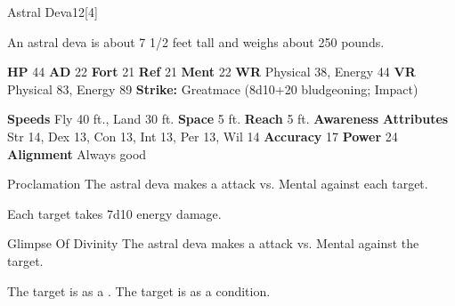       
  \begin{monsubsection}{Astral Deva}{12}[4]
    \vspace{-1em}\vspace{-1em}
    \vspace{0em}

    
          An astral deva is about 7 1/2 feet tall and weighs about 250 pounds.
        

    \begin{spellcontent}
      \begin{spelltargetinginfo}
        \pari \textbf{HP} 44 \monsep
          \textbf{AD} 22 \monsep
          \textbf{Fort} 21 \monsep
          \textbf{Ref} 21 \monsep
          \textbf{Ment} 22
        \pari \textbf{WR} Physical 38, Energy 44 \monsep
        \textbf{VR} Physical 83, Energy 89
        \pari \textbf{Strike:}
            Greatmace  (8d10+20 bludgeoning; Impact)
      \end{spelltargetinginfo}
    \end{spellcontent}
    \begin{monsterfooter}
      \pari \textbf{Speeds} Fly 40 ft., Land 30 ft. \monsep
        \textbf{Space} 5 ft. \monsep
        \textbf{Reach} 5 ft.
      \pari \textbf{Awareness} 
      \pari \textbf{Attributes}
        Str 14, Dex 13,
        Con 13, Int 13,
        Per 13, Wil 14
      \pari \textbf{Accuracy} 17 \monsep
        \textbf{Power} 24
      \pari \textbf{Alignment} Always good
    \end{monsterfooter}
  \end{monsubsection}
  \begin{freeability}{Proclamation}
       The astral deva makes a  attack
        vs. Mental against each target.
    
    \hit Each target takes 7d10 energy damage.
    \end{freeability}
  

    \begin{freeability}{Glimpse Of Divinity}
       The astral deva makes a  attack
        vs. Mental against the target.
    
    \hit The target is  as a .
    \crit The target is  as a condition.
    \end{freeability}
  

